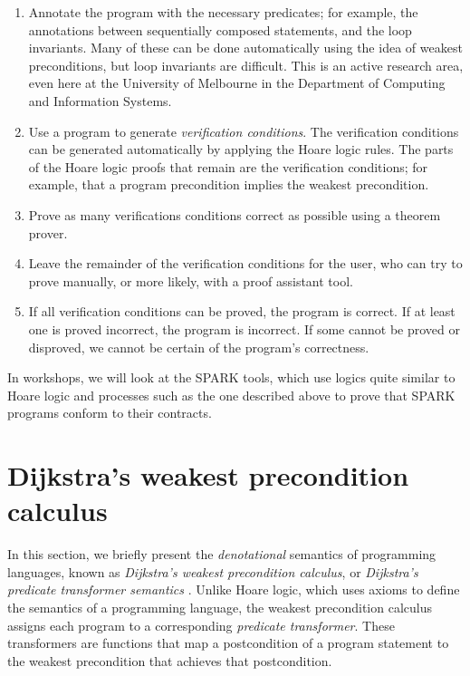 \begin{enumerate}

 \item Annotate the program with the necessary predicates; for example, the annotations between sequentially composed statements, and the loop invariants. Many of these can be done automatically using the idea of weakest preconditions, but loop invariants are difficult. This is an active research area, even here at the University of Melbourne in the Department of Computing and Information Systems.

 \item Use a program to generate \emph{verification conditions}. The verification conditions can be generated automatically by applying the Hoare logic rules. The parts of the Hoare logic proofs that remain are the verification conditions; for example, that a program precondition implies the weakest precondition.

 \item Prove as many verifications conditions correct as possible using a theorem prover.

 \item Leave the remainder of the verification conditions for the user, who can try to prove manually, or more likely, with a proof assistant tool.

 \item If all verification conditions can be proved, the program is correct. If at least one is proved incorrect, the program is incorrect. If some cannot be proved or disproved, we cannot be certain of the program's correctness.

\end{enumerate}

In workshops, we will look at the SPARK tools, which use logics quite similar to Hoare logic and processes such as the one described above to prove that SPARK programs conform to their contracts.

\section{Dijkstra's weakest precondition calculus}

In this section, we briefly present the \emph{denotational} semantics of programming languages, known as \emph{Dijkstra's weakest precondition calculus}, or \emph{Dijkstra's predicate transformer semantics} \cite{dijkstra78}. Unlike Hoare logic, which uses axioms to define the semantics of a programming language, the weakest precondition calculus assigns each program to a corresponding \emph{predicate transformer}. These transformers are functions that map a postcondition of a program statement to the weakest precondition that achieves that postcondition.

